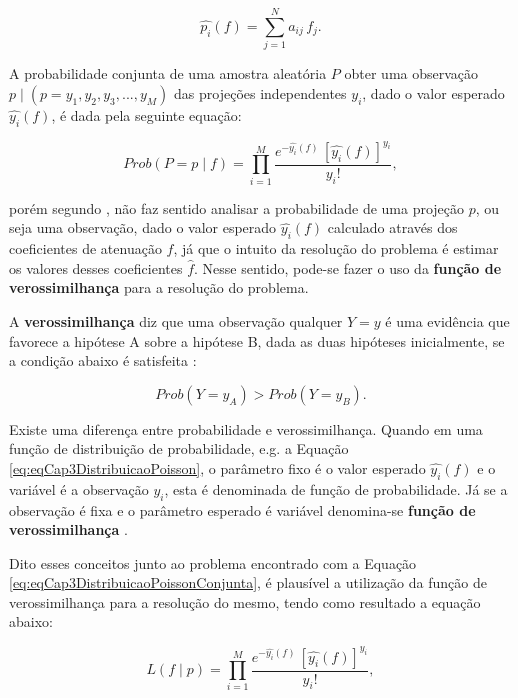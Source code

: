 {{\begin{equation}
\hat{p_{i}}(f) = \sum_{j=1}^{N} a_{ij} \, f_{j}.
\label{eq:eqCap3BeerEsperancaAtenuacao}
\end{equation}

A probabilidade conjunta de uma amostra aleatória $P$ obter uma observação $p \mid (p = {y_{1},y_{2},y_{3},...,y_{M}})$ das projeções independentes $y_{i}$, dado o valor esperado $\hat{y_{i}}(f)$, é dada pela seguinte equação:   

\begin{equation}
Prob(P = p\mid f ) = \prod_{i=1}^{M}  \dfrac{e^{-\hat{y_{i}}(f)} \, [\hat{y_{i}}(f)]^{y_{i}}}  {y_{i}!},
\label{eq:eqCap3DistribuicaoPoissonConjunta}
\end{equation}

\noindent porém segundo , não faz sentido analisar a probabilidade de uma projeção $p$, ou seja uma observação, dado o valor esperado $\hat{y_{i}}(f)$ calculado através dos coeficientes de atenuação $f$, já que o intuito da resolução do problema é estimar os valores desses coeficientes $\hat{f}$. Nesse sentido, pode-se fazer o uso da \textbf{função de verossimilhança} para a resolução do problema.

A \textbf{verossimilhança} diz que uma observação qualquer $Y = y$ é uma evidência que favorece a hipótese A sobre a hipótese B, dada as duas hipóteses inicialmente, se a condição abaixo é satisfeita \cite{morettin2010}:

\begin{equation}
Prob(Y=y_{A}) >Prob(Y=y_{B}).
\label{eq:eqCap3LeiVerossimilhanca}
\end{equation}

Existe uma diferença entre probabilidade e verossimilhança. Quando em uma função de distribuição de probabilidade, e.g. a Equação \ref{eq:eqCap3DistribuicaoPoisson}, o parâmetro fixo é o valor esperado $\hat{y_{i}}(f)$ e o variável é a observação $y_{i}$, esta é denominada de função de probabilidade. Já se a observação é fixa e o parâmetro esperado é variável denomina-se \textbf{função de verossimilhança} \cite{morettin2010}.

Dito esses conceitos junto ao problema encontrado com a Equação \ref{eq:eqCap3DistribuicaoPoissonConjunta}, é plausível a utilização da função de verossimilhança para a resolução do mesmo, tendo como resultado a equação abaixo: 

\begin{equation}
L(f \mid p) = \prod_{i=1}^{M}  \dfrac{e^{-\hat{y_{i}}(f)} \, [\hat{y_{i}}(f)]^{y_{i}}}  {y_{i}!},
\label{eq:eqCap3DistribuicaoPoissonConjuntaVerossimilhanca1}
\end{equation} 
  
}}
